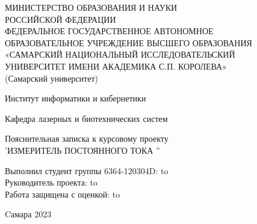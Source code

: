 \begin{titlepage}
\newpage
\begin{doublespace}
\begin{center}
МИНИСТЕРСТВО ОБРАЗОВАНИЯ И НАУКИ \\
РОССИЙСКОЙ ФЕДЕРАЦИИ\\
ФЕДЕРАЛЬНОЕ ГОСУДАРСТВЕННОЕ АВТОНОМНОЕ\\
ОБРАЗОВАТЕЛЬНОЕ УЧРЕЖДЕНИЕ ВЫСШЕГО ОБРАЗОВАНИЯ\\
«САМАРСКИЙ НАЦИОНАЛЬНЫЙ ИССЛЕДОВАТЕЛЬСКИЙ\\
УНИВЕРСИТЕТ ИМЕНИ АКАДЕМИКА С.П. КОРОЛЕВА»	\\
(Самарский университет) \\
\end{center}

\vspace{4em}

\begin{center}
Институт информатики и кибернетики \\ 
\end{center}

\begin{center}
Кафедра лазерных и биотехнических систем \\ 
\end{center}


\vspace{3em}

\begin{center}
{Пояснительная записка к курсовому проекту\\'ИЗМЕРИТЕЛЬ ПОСТОЯННОГО ТОКА ''}
\end{center}

\vspace{11em}




\newbox{\lbox}
\newlength{\maxl}
\setlength{\maxl}{\wd\lbox}
\hfill\parbox{15cm}{
\hspace*{5cm}\hspace*{-5cm}Выполнил студент группы 6364-120304D:\hfill\underline{\hspace{4em}}  \hbox to\\
\hspace*{5cm}\hspace*{-5cm}Руководитель проекта:\hfill\underline{\hspace{4em}}  \hbox to\\
\hspace*{5cm}\hspace*{-5cm}Работа защищена с оценкой:\hfill\underline{\hspace{4em}}  \hbox to\maxl{ \hfill }\\
}


\vspace{\fill}

\begin{center}Cамара 2023\end{center}

\end{doublespace}
\end{titlepage}
\setcounter{page}{2}